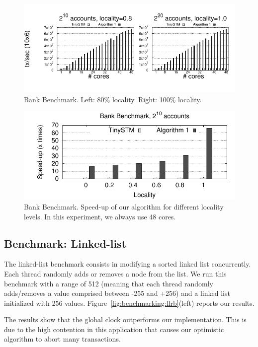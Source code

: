 \begin{figure}[!t]
	\centering
	\includegraphics[scale = 1.0]{results/intset/bank.pdf}
	\caption{Bank Benchmark. Left: 80\% locality. Right: 100\% locality.\label{fig:benchmarking:bank}}
\end{figure}

\begin{figure}[!t]
	\centering
	\includegraphics[scale = 0.8]{results/bank-speedup/bank-speedup.pdf}
	\caption{Bank Benchmark. Speed-up of our algorithm for different locality levels. In this experiment, we always use 48 cores.\label{fig:benchmarking:bank:speedup}}
\end{figure}


\subsection{Benchmark: Linked-list}

The linked-list benchmark consists in modifying a sorted linked list concurrently. 
Each thread randomly adds or removes a node from the list. 
We run this benchmark with a range of 512 (meaning that each thread randomly adds/removes a value comprised between -255 and +256) and a linked list initialized with 256 values.
Figure~\ref{fig:benchmarking:llrb}(left) reports our results.

The results show that the global clock outperforms our implementation. 
This is due to the high contention in this application that causes our optimistic algorithm to abort  many transactions.

